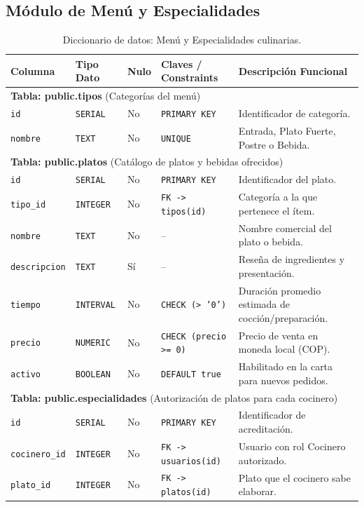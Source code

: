 \documentclass[11pt,letterpaper]{article}
\begin{document}
\subsection{Módulo de Menú y Especialidades}

\begin{table}[h!]
\centering
\scriptsize
\begin{tabularx}{\textwidth}{l l l p{2.8cm} X}
\toprule
\textbf{Columna} & \textbf{Tipo Dato} & \textbf{Nulo} & \textbf{Claves / Constraints} & \textbf{Descripción Funcional} \\
\midrule
\multicolumn{5}{l}{\textbf{Tabla: public.tipos} (Categorías del menú)} \\
\texttt{id} & \texttt{SERIAL} & No & \texttt{PRIMARY KEY} & Identificador de categoría. \\
\texttt{nombre} & \texttt{TEXT} & No & \texttt{UNIQUE} & Entrada, Plato Fuerte, Postre o Bebida. \\
\midrule
\multicolumn{5}{l}{\textbf{Tabla: public.platos} (Catálogo de platos y bebidas ofrecidos)} \\
\texttt{id} & \texttt{SERIAL} & No & \texttt{PRIMARY KEY} & Identificador del plato. \\
\texttt{tipo\_id} & \texttt{INTEGER} & No & \texttt{FK -> tipos(id)} & Categoría a la que pertenece el ítem. \\
\texttt{nombre} & \texttt{TEXT} & No & -- & Nombre comercial del plato o bebida. \\
\texttt{descripcion} & \texttt{TEXT} & Sí & -- & Reseña de ingredientes y presentación. \\
\texttt{tiempo} & \texttt{INTERVAL} & No & \texttt{CHECK (> '0')} & Duración promedio estimada de cocción/preparación. \\
\texttt{precio} & \texttt{NUMERIC} & No & \texttt{CHECK (precio >= 0)} & Precio de venta en moneda local (COP). \\
\texttt{activo} & \texttt{BOOLEAN} & No & \texttt{DEFAULT true} & Habilitado en la carta para nuevos pedidos. \\
\midrule
\multicolumn{5}{l}{\textbf{Tabla: public.especialidades} (Autorización de platos para cada cocinero)} \\
\texttt{id} & \texttt{SERIAL} & No & \texttt{PRIMARY KEY} & Identificador de acreditación. \\
\texttt{cocinero\_id} & \texttt{INTEGER} & No & \texttt{FK -> usuarios(id)} & Usuario con rol Cocinero autorizado. \\
\texttt{plato\_id} & \texttt{INTEGER} & No & \texttt{FK -> platos(id)} & Plato que el cocinero sabe elaborar. \\
\bottomrule
\end{tabularx}
\caption{Diccionario de datos: Menú y Especialidades culinarias.}
\label{tab:dict_menu}
\end{table}
\end{document}
